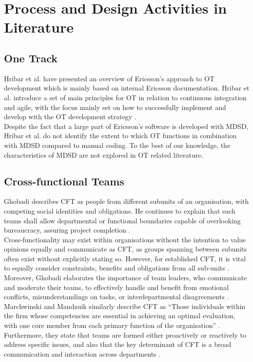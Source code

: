 \documentclass[fina_report_innit.tex]{subfiles}
\begin{document}
\section{Process and Design Activities in Literature}

\subsection{One Track}
Hribar et al. \cite{hribar2008first} have presented an overview of Ericsson's approach to OT development which is mainly based on internal Ericsson documentation. Hribar et al. introduce a set of main principles for OT in relation to continuous integration and agile, with the focus mainly set on how to successfully implement and develop with the OT development strategy \cite{hribar2008first}.
\\

Despite the fact that a large part of Ericsson's software is developed with MDSD, Hribar et al. do not identify the extent to which OT functions in combination with MDSD compared to manual coding. To the best of our knowledge, the characteristics of MDSD are not explored in OT related literature.

\subsection{Cross-functional Teams}
Ghobadi describes CFT as people from different subunits of an organisation, with competing social identities and obligations. He continues to explain that such teams shall allow departmental or functional boundaries capable of overlooking bureaucracy, assuring project completion \cite{ghobadi2011challenges}.
\\

Cross-functionality may exist within organisations without the intention to value opinions equally and communicate as CFT, as groups spanning between subunits often exist without explicitly stating so. However, for established CFT, it is vital to equally consider constraints, benefits and obligations from all sub-units \cite{ghobadi2011challenges}. Moreover, Ghobadi elaborates the importance of team leaders, who communicate and moderate their teams, to effectively handle and benefit from emotional conflicts, misunderstandings on tasks, or interdepartmental disagreements \cite{ghobadi2011challenges}.
\\

Marchwinski and Mandzuik similarly describe CFT as ``Those individuals within the firm whose competencies are essential in achieving an optimal evaluation, with one core member from each primary function of the organisation'' \cite{marchwinski2000technical}. Furthermore, they state that teams are formed either proactively or reactively to address specific issues, and also that the key determinant of CFT is a broad communication and interaction across departments \cite{marchwinski2000technical}.
\end{document}
